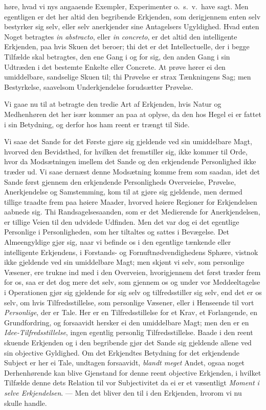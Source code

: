 \documentclass[12pt,a4paper]{book}
\newcommand{\apage}[1]{\marginnote{\footnotesize\textit{[#1]}}}
\begin{document}
høre, hvad vi nys angaaende Exempler, Experimenter o.\ s.\ v.\ have sagt. Men
egentligen er det her altid den begribende Erkjenden, som derigjennem enten
selv bestyrker sig selv, eller selv anerkjender sine Antagelsers Ugyldighed.
Hvad enten Noget betragtes \textit{in abstracto}, eller \textit{in concreto},
er det altid den intelligente Erkjenden, paa hvis Skuen det beroer; thi det er
det Intellectuelle, der i begge Tilfælde skal betragtes, den ene Gang i og for
sig, den anden Gang i sin Udtræden i det bestemte Enkelte eller Concrete. At
prøve hører ei den umiddelbare, sandselige Skuen til; thi Prøvelse er strax
Tænkningens Sag; men Bestyrkelse, saavelsom Underkjendelse forudsætter
Prøvelse.

Vi gaae nu til at betragte den tredie Art af Erkjenden, hvis Natur og
Medhenhøren det her især kommer an paa at oplyse, da den hos Hegel ei er fattet
i sin Betydning, og derfor hos ham reent er trængt til Side.

Vi saae det Sande for det Første gjøre sig gjeldende ved sin umiddelbare Magt,
hvorved den Bevidsthed, for hvilken det fremstiller sig, ikke kommer til Orde,
hvor da Modsætningen imellem det Sande og den erkjendende Personlighed ikke
træder ud. Vi saae dernæst denne Modsætning komme frem som saadan, idet det
Sande først gjennem den erkjendende Personligheds Overveielse, Prøvelse,
Anerkjendelse og Samstemming, kom til at gjøre sig gjeldende, men dermed
tillige traadte frem paa høiere Maader, hvorved høiere Regioner for
Erkjendelsen aabnede sig. Thi Randsagelsesaanden, som er det Medierende for
Anerkjendelsen, er tillige Veien til den udvidede Udfinden. Men det \apage{107} var dog ei
det egentlige Personlige i Personligheden, som her tiltaltes og sattes i
Bevægelse. Det Almeengyldige gjør sig, naar vi befinde os i den egentlige
tænkende eller intelligente Erkjendens, i Forstands- og
Fornuftnødvendighedens Sphære, vistnok ikke gjeldende ved sin umiddelbare
Magt; men skjønt vi selv, som personlige Væsener, ere trukne ind med i den
Overveien, hvorigjennem det først træder frem for os, saa er det dog mere det
selv, som gjennem os og under vor Meddeeltagelse i Operationen gjør sig
gjeldende for sig selv og tilfredsstiller sig selv, end det er os selv, om
hvis Tilfredsstillelse, som personlige Væsener, eller i Henseende til vort
\emph{Personlige}, der er Tale. Her er en Tilfredsstillelse for et Krav, et
Forlangende, en Grundfordring, og forsaavidt hersker ei den umiddelbare Magt;
men den er en \emph{Idee-Tilfredsstillelse}, ingen egentlig personlig
Tilfredsstillelse. Baade i den reent skuende Erkjenden og i den begribende
gjør det Sande sig gjeldende allene ved sin objective Gyldighed. Om det
Erkjendtes Betydning for det erkjendende Subject er her ei Tale, undtagen
forsaavidt, \emph{blandt meget} Andet, ogsaa noget Derhenhørende kan blive Gjenstand
for denne reent objective Erkjenden, i hvilket Tilfælde denne dets Relation
til vor Subjectivitet da ei er et væsentligt \emph{Moment i selve Erkjendelsen}. ---
Men det bliver den til i den Erkjenden, hvorom vi nu skulle handle.
\end{document}
